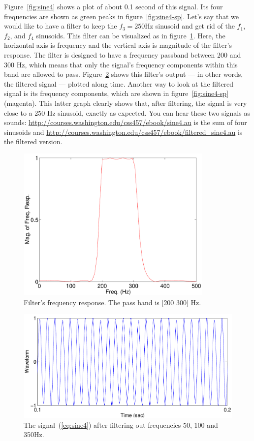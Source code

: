 Figure~\ref{fig:sine4} shows a plot of about 0.1 second of this
signal. Its four frequencies are shown as green peaks in
figure~\ref{fig:sine4-sp}.  Let's say that we would like to have a
filter to keep the $f_3=250$Hz sinusoid and get rid of the $f_1$,
$f_2$, and $f_4$ sinusoids. This filter can be visualized as in
figure~\ref{fig:sine4-band}. Here, the horizontal axis is frequency
and the vertical axis is magnitude of the filter's response. The
filter is designed to have a frequency passband between 200 and 300
Hz, which means that only the signal's frequency components within
this band are allowed to pass. Figure~\ref{fig:sine4-f2} shows this
filter's output --- in other words, the filtered signal --- plotted
along time. Another way to look at the filtered signal is its
frequency components, which are shown in figure~\ref{fig:sine4-sp}
(magenta). This latter graph clearly shows that, after filtering, the
signal is very close to a 250 Hz sinusoid, exactly as expected.  You
can hear these two signals as sounds:
\url{http://courses.washington.edu/css457/ebook/sine4.au} is the sum
of four sinusoids and
\url{http://courses.washington.edu/css457/ebook/filtered_sine4.au} is
the filtered version.   

\begin{figure}
\centerline{\includegraphics[height=3in]{ch-fir/sine4_band200-300}}
\caption[Filter frequency response]{Filter's frequency response. The
pass band is [200 300] Hz.\label{fig:sine4-band}}
\end{figure}

\begin{figure}
\centerline{\includegraphics[width=5in]{ch-fir/sine4_filted}}
\caption[A filtered signal]{The signal~(\protect\ref{eq:sine4}) after filtering out
frequencies 50, 100 and 350Hz.\label{fig:sine4-f2}}
\end{figure}

